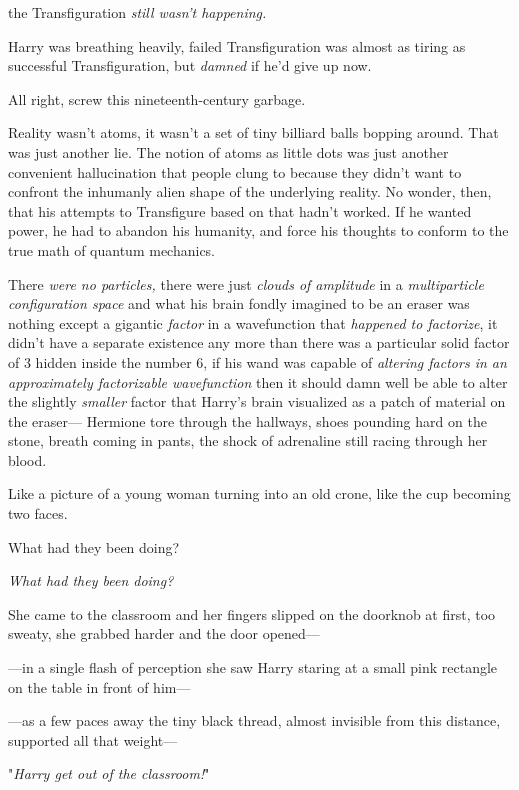 {\el} the Transfiguration \emph{still wasn't happening.}

Harry was breathing heavily, failed Transfiguration was almost as tiring as
successful Transfiguration, but \emph{damned} if he'd give up now.

All right, screw this nineteenth-century garbage.

Reality wasn't atoms, it wasn't a set of tiny billiard balls bopping around.
That was just another lie. The notion of atoms as little dots was just another
convenient hallucination that people clung to because they didn't want to
confront the inhumanly alien shape of the underlying reality. No wonder, then,
that his attempts to Transfigure based on that hadn't worked. If he wanted
power, he had to abandon his humanity, and force his thoughts to conform to the
true math of quantum mechanics.

There \emph{were no particles,} there were just \emph{clouds of amplitude} in a
\emph{multiparticle configuration space} and what his brain fondly imagined to
be an eraser was nothing except a gigantic \emph{factor} in a wavefunction that
\emph{happened to factorize}, it didn't have a separate existence any more than
there was a particular solid factor of 3 hidden inside the number 6, if his
wand was capable of \emph{altering factors in an approximately factorizable
wavefunction} then it should damn well be able to alter the slightly
\emph{smaller} factor that Harry's brain visualized as a patch of material on
the eraser\mbox{---}
\sbreak
Hermione tore through the hallways, shoes pounding hard on the stone, breath
coming in pants, the shock of adrenaline still racing through her blood.

Like a picture of a young woman turning into an old crone, like the cup
becoming two faces.

What had they been doing?

\emph{What had they been doing?}

She came to the classroom and her fingers slipped on the doorknob at first, too
sweaty, she grabbed harder and the door opened\mbox{---}

---in a single flash of perception she saw Harry staring at a small pink
rectangle on the table in front of him\mbox{---}

---as a few paces away the tiny black thread, almost invisible from this
distance, supported all that weight\mbox{---}

"\emph{Harry get out of the classroom!}"

